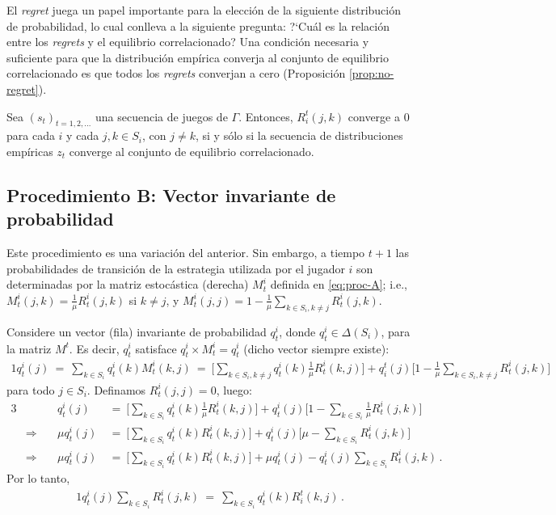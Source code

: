 El \textit{regret} juega un papel importante para la elección de la siguiente distribución de probabilidad, lo cual conlleva a la siguiente pregunta: ?`Cuál es la relación entre los \textit{regrets} y el equilibrio correlacionado? Una condición necesaria y suficiente para que la distribución empírica converja al conjunto de equilibrio correlacionado es que todos los \textit{regrets} converjan a cero (Proposición \ref{prop:no-regret}).

\begin{theorem}
\label{prop:no-regret}
Sea $(s_t)_{t = 1, 2, ...}$ una secuencia de juegos de $\Gamma$.
Entonces, $R_i^t(j, k)$ converge a $0$ para cada $i$ y cada $j, k \in S_i$, con $j \neq k$, si y sólo si la secuencia de distribuciones empíricas $z_t$ converge al conjunto de equilibrio correlacionado.
\end{theorem}


\subsection*{Procedimiento B: Vector invariante de probabilidad}

Este procedimiento es una variación del anterior. Sin embargo, a tiempo $t+1$ las probabilidades de transición de la estrategia utilizada por el jugador $i$ son determinadas por la matriz estocástica (derecha) $M^i_t$ definida en \eqref{eq:proc-A}; i.e., $M^i_t(j,k)=\frac{1}{\mu}R^i_t(j,k)$ si $k\neq j$, y $M^i_t(j,j)=1-\frac{1}{\mu}\sum_{k\in S_i,k\neq j} R^i_t(j,k)$.

Considere un vector (fila) invariante de probabilidad $q^i_t$, donde $q^i_t\in \Delta(S_i)$, para la matriz $M^t$. Es decir, $q^i_t$ satisface $q^i_t \times M^i_t = q^i_t$ (dicho vector siempre existe):
\begin{alignat}{1}
  q^i_t(j)\ 
    =\ \sum_{k\in S_i} q^i_t(k) M^i_t(k,j)\ 
    =\ \bigg[\sum_{k \in S_i, k \neq j} q^i_t(k)\frac{1}{\mu}R^i_t(k,j)\bigg] + q_i^t(j)\biggl[1 - \frac{1}{\mu}\sum_{k \in S_i, k \neq j} R^i_t(j,k)\biggr]
\end{alignat}
para todo $j \in S_i$. Definamos $R_t^i(j, j) = 0$, luego:
\begin{alignat}{3}
  &
  & q^i_t(j)\ &=\ \biggl[\sum_{k \in S_i} q^i_t(k)\frac{1}{\mu}R^i_t(k,j)\biggr] + q^i_t(j)\biggl[1 - \sum_{k \in S_i} \frac{1}{\mu} R^i_t(j,k)\biggr] \\
  &\Rightarrow\quad
  &\mu q_t^i(j)\ &=\ \biggl[\sum_{k \in S_i}q^i_t(k)R^i_t(k,j)\biggr] + q^i_t(j)\biggl[\mu - \sum_{k \in S_i} R^i_t(j, k)\biggr] \\
  &\Rightarrow\quad
  &\mu q^i_t(j)\ & =\ \biggl[\sum_{k \in S_i}q^i_t(k)R^i_t(k,j)\biggr] + \mu q^i_t(j) - q^i_t(j)\sum_{k\in S_i} R^i_t(j,k) \,.
\end{alignat}
Por lo tanto,
\begin{alignat}{1}
\label{eq:proc-B}
q^i_t(j)\sum_{k \in S_i} R^i_t(j,k)\ =\ \sum_{k \in S_i} q_t^i(k)R_i^t(k,j) \,.
\end{alignat}

